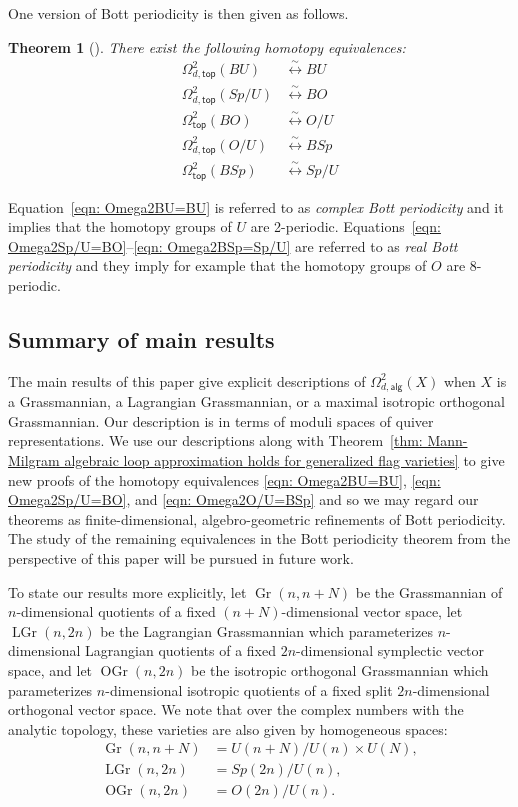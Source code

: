 \documentclass{amsart}
\newtheorem{theorem}{Theorem}[section]
\theoremstyle{definition}
\newcommand{\alg}{\mathsf{alg}}
\renewcommand{\top}{\mathsf{top}}
\newcommand{\Gr}{\operatorname{Gr}}
\newcommand{\LGr}{\operatorname{LGr}}
\newcommand{\OGr}{\operatorname{OGr}}
\newcommand{\LoopTwo}{\Omega^{2}_{d,\alg}}
\newcommand{\LoopTwoTop}{\Omega^{2}_{d,\top}}
\newcommand{\NoDLoopTwoTop}{\Omega^{2}_{\top}}
\newcommand{\homotopyeq}{\overset \sim \longleftrightarrow}
\begin{document}
One version of Bott periodicity is then given as follows.

\begin{theorem}[\cite{Bott-Periodicity-1959}]\label{thm: classical Bott periodicity as homotopy equivalences}
There exist the following homotopy equivalences:
\begin{align}
\LoopTwoTop (BU)&\homotopyeq BU \label{eqn: Omega2BU=BU}\\
\LoopTwoTop (Sp/U)&\homotopyeq BO  \label{eqn: Omega2Sp/U=BO}\\
\NoDLoopTwoTop (BO)&\homotopyeq O/U  \label{eqn: Omega2BO=O/U}\\
\LoopTwoTop (O/U)&\homotopyeq BSp  \label{eqn: Omega2O/U=BSp}\\
\NoDLoopTwoTop (BSp)&\homotopyeq Sp/U   \label{eqn: Omega2BSp=Sp/U}
\end{align}
\end{theorem}

Equation~\eqref{eqn: Omega2BU=BU} is referred to as \emph{complex Bott
periodicity} and it implies that the homotopy groups of $U$ are
2-periodic. Equations~\eqref{eqn: Omega2Sp/U=BO}--\eqref{eqn: Omega2BSp=Sp/U} 
are referred to as \emph{real Bott periodicity} and they imply for example that
the homotopy groups of $O$ are 8-periodic.

\subsection{Summary of main results}

The main results of this paper give explicit descriptions of $\LoopTwo
(X)$ when $X$ is a Grassmannian, a Lagrangian Grassmannian, or a maximal
isotropic orthogonal Grassmannian. Our description is in terms of
moduli spaces of quiver representations. We use our descriptions along
with Theorem~\ref{thm: Mann-Milgram algebraic loop approximation
holds for generalized flag varieties} to give new proofs of the
homotopy equivalences \eqref{eqn: Omega2BU=BU}, \eqref{eqn:
Omega2Sp/U=BO}, and \eqref{eqn: Omega2O/U=BSp} and so we may regard
our theorems as finite-dimensional, algebro-geometric refinements of Bott
periodicity. The study of the remaining equivalences in the Bott
periodicity theorem from the perspective of this paper will be pursued
in future work.

To state our results more explicitly, let $ \Gr(n,n+N) $ be the
Grassmannian of $n$-dimensional quotients of a fixed $(n+N)$-dimensional
vector space, let $ \LGr (n,2n) $ be the Lagrangian Grassmannian which
parameterizes $n$-dimensional Lagrangian quotients of a fixed
$2n$-dimensional symplectic vector space, and let $ \OGr (n,2n) $ be
the isotropic orthogonal Grassmannian which parameterizes
$n$-dimensional isotropic quotients of a fixed split $2n$-dimensional
orthogonal vector space. We note that over the complex numbers with
the analytic topology, these varieties are also given by homogeneous
spaces:
\begin{align*}
\Gr (n,n+N)&=U(n+N)/U(n)\times U(N),\\
\LGr (n,2n)&= Sp(2n)/U(n),\\
\OGr (n,2n)&= O(2n)/U(n) .
\end{align*}
\end{document}
